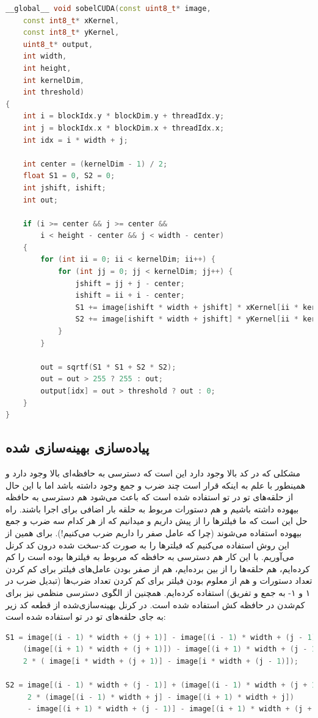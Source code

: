 \documentclass{article}
\begin{document}
\begin{latin}
\begin{lstlisting}[language=C++]
__global__ void sobelCUDA(const uint8_t* image, 
    const int8_t* xKernel, 
    const int8_t* yKernel,
    uint8_t* output, 
    int width, 
    int height, 
    int kernelDim, 
    int threshold)
{
    int i = blockIdx.y * blockDim.y + threadIdx.y;
    int j = blockIdx.x * blockDim.x + threadIdx.x;
    int idx = i * width + j;

    int center = (kernelDim - 1) / 2;
    float S1 = 0, S2 = 0;
    int jshift, ishift;
    int out;

    if (i >= center && j >= center && 
        i < height - center && j < width - center) 
    {
        for (int ii = 0; ii < kernelDim; ii++) {
            for (int jj = 0; jj < kernelDim; jj++) {
                jshift = jj + j - center;
                ishift = ii + i - center;
                S1 += image[ishift * width + jshift] * xKernel[ii * kernelDim + jj];
                S2 += image[ishift * width + jshift] * yKernel[ii * kernelDim + jj];
            }
        }

        out = sqrtf(S1 * S1 + S2 * S2);
        out = out > 255 ? 255 : out;
        output[idx] = out > threshold ? out : 0;
    }
}
\end{lstlisting}
\end{latin}

\subsection{پیاده‌سازی بهینه‌سازی شده}
مشکلی که در کد بالا وجود دارد این است که دسترسی به حافظه‌ای بالا وجود دارد و همینطور با
علم به اینکه قرار است چند ضرب و جمع وجود داشته باشد اما با این حال از حلقه‌های تو در تو
استفاده شده است که باعث می‌شود هم دسترسی به حافظه بیهوده داشته باشیم و هم دستورات مربوط به حلقه بار اضافی برای اجرا باشند. راه حل این است که ما فیلتر‌ها را از پیش داریم و میدانیم که از هر کدام سه ضرب و جمع بیهوده استفاده می‌شوند (چرا که عامل صفر را داریم ضرب می‌کنیم!).
برای همین از این روش استفاده می‌کنیم که فیلتر‌ها را به صورت کد-سخت شده
درون کد کرنل می‌آوریم. با این کار هم دسترسی به حافظه که مربوط به فیلتر‌ها بوده است را کم کرده‌ایم، هم حلقه‌ها را از بین برده‌ایم، هم از صفر بودن عامل‌های فیلتر برای کم کردن تعداد دستورات و هم از معلوم بودن فیلتر برای کم کردن تعداد ضرب‌ها (تبدیل ضرب در ۱ و ۱- به جمع و تفریق) استفاده کرده‌ایم. همچنین از الگوی دسترسی منظمی نیز برای کم‌شدن  در حافظه کش استفاده شده‌ است. در کرنل بهینه‌سازی‌شده از قطعه کد زیر به جای حلقه‌های تو در تو استفاده شده‌ است:
\begin{latin}
\begin{lstlisting}[language=C++]
S1 = image[(i - 1) * width + (j + 1)] - image[(i - 1) * width + (j - 1)] +
	(image[(i + 1) * width + (j + 1)]) - image[(i + 1) * width + (j - 1)] +
    2 * ( image[i * width + (j + 1)] - image[i * width + (j - 1)]);

S2 = image[(i - 1) * width + (j - 1)] + (image[(i - 1) * width + (j + 1)]) +
     2 * (image[(i - 1) * width + j] - image[(i + 1) * width + j])
     - image[(i + 1) * width + (j - 1)] - image[(i + 1) * width + (j + 1)];
\end{lstlisting}
\end{latin}
\end{document}
